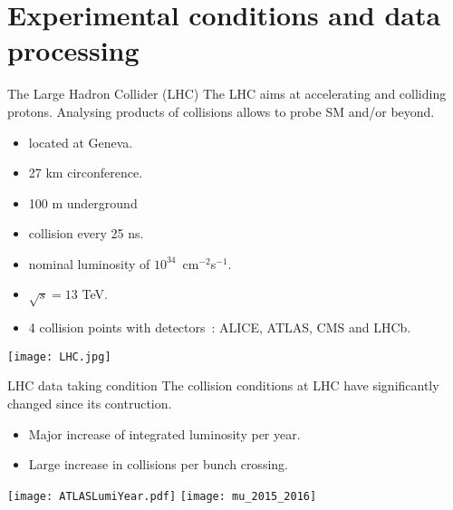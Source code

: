 \section{Experimental conditions and data processing}
\frame{\tableofcontents[currentsection]}

\begin{frame}{The Large Hadron Collider (LHC)}
  The LHC aims at accelerating and colliding protons.
  Analysing products of collisions allows to probe SM and/or beyond.
  \vfill
  
  \begin{minipage}{0.49\linewidth}
    \begin{itemize}
    \item located at Geneva.
    \item 27 km circonference.
    \item 100 m underground
    \item collision every 25 ns.
    \item nominal luminosity of $10^{34}$~cm$^{-2}$s$^{-1}$.
    \item $\sqrt{s}=13$ TeV.
    \item 4 collision points with detectors~: ALICE, ATLAS, CMS and LHCb.
    \end{itemize}
    \end{minipage}
  \hfill
  \begin{minipage}{0.49\linewidth}
    \texttt{[image: LHC.jpg]}
    \end{minipage}
\end{frame}
\begin{frame}{LHC data taking condition}
  The collision conditions at LHC have significantly changed since its contruction.
  \begin{itemize}
  \item Major increase of integrated luminosity per year.
  \item Large increase in collisions per bunch crossing.
  \end{itemize}

  \begin{center} \texttt{[image: ATLASLumiYear.pdf]}
  \texttt{[image: mu\_2015\_2016]} \end{center}
\end{frame}
